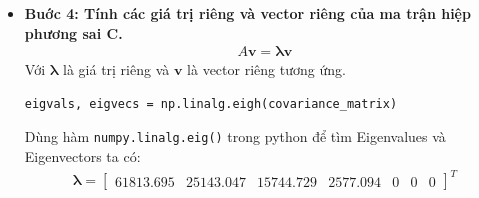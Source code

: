\begin{itemize}
\begin{align}
                    \end{align}
                    \begin{align*}
                        C = \begin{bmatrix}
                        9289.284 & 7741.072 & 4644.643 & 4644.643 & 4644.643 & 7741.072 & 9289.284 \\
                        7741.072 & 15482.142 & 9289.284 & -1548.214 & 9289.284 & 15482.142 & 7741.072 \\
                        4644.643 & 9289.284 & 18578.570 & 7741.071 & 18578.570 & 9289.284 & 4644.643 \\
                        4644.643 & -1548.214 & 7741.071 & 18578.570 & 7741.071 & -1548.214 & 4644.643 \\
                        4644.643 & 9289.284 & 18578.570 & 7741.071 & 18578.570 & 9289.284 & 4644.643 \\
                        7741.072 & 15482.142 & 9289.284 & -1548.214 & 9289.284 & 15482.142 & 7741.072 \\
                        9289.284 & 7741.072 & 4644.643 & 4644.643 & 4644.643 & 7741.072 & 9289.284
                        \end{bmatrix}
                    \end{align*}
                \item \textbf{Buớc 4: Tính các giá trị riêng và vector riêng của ma trận hiệp phương sai C. }
                    \begin{align}
                        A \mathbf{v} = \boldsymbol{\lambda} \mathbf{v}
                    \end{align}
                    Với $\boldsymbol{\lambda}$ là giá trị riêng và $\mathbf{v}$ là vector riêng tương ứng.\\
                    \begin{lstlisting}
eigvals, eigvecs = np.linalg.eigh(covariance_matrix)
                    \end{lstlisting}
                    Dùng hàm \texttt{numpy.linalg.eig()} trong python để tìm Eigenvalues và Eigenvectors ta có:\\
                    \begin{align*}
                        \boldsymbol{\lambda} = \begin{bmatrix}
                        61813.695 & 25143.047 & 15744.729 & 2577.094 & 0 & 0 & 0
                        \end{bmatrix}^T

\end{align*}
\end{itemize}
